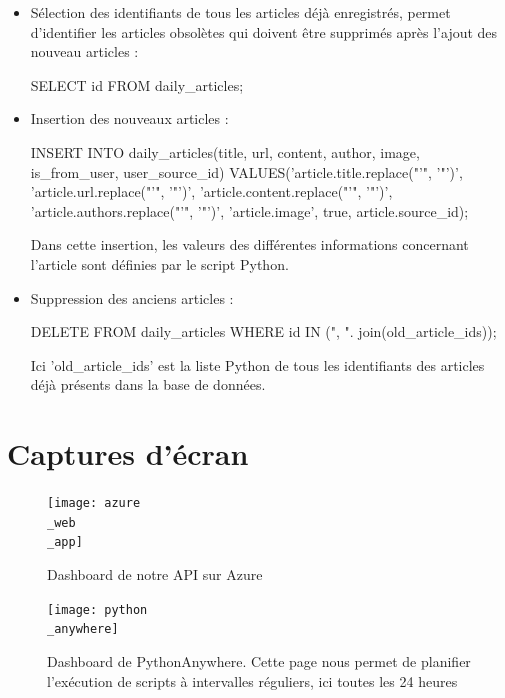 \documentclass[french]{article}
\begin{document}
\begin{itemize}
\begin{itemize}
            \item Sélection des identifiants de tous les articles déjà enregistrés, permet d'identifier les articles obsolètes qui doivent être supprimés après l'ajout des nouveau articles :
            \begin{spverbatim}
            SELECT id FROM daily_articles;
            \end{spverbatim}
            \item Insertion des nouveaux articles :
            \begin{spverbatim}
            INSERT INTO daily_articles(title, url, content, author, image, is_from_user, user_source_id) VALUES('{article.title.replace("'", '"')}', '{article.url.replace("'", '"')}', '{article.content.replace("'", '"')}', '{article.authors.replace("'", '"')}', '{article.image}', true, {article.source_id});
            \end{spverbatim}
            Dans cette insertion, les valeurs des différentes informations concernant l'article sont définies par le script Python.
            \item Suppression des anciens articles :
            \begin{spverbatim}
            DELETE FROM daily_articles WHERE id IN ({", ". join(old_article_ids)});
            \end{spverbatim}
            Ici 'old\_article\_ids' est la liste Python de tous les identifiants des articles déjà présents dans la base de données.
        \end{itemize}
    \end{itemize}



    \section*{Captures d'écran}
    \begin{figure}[h]
        \texttt{[image: azure\\\_web\\\_app]}
        \centering
        \caption{Dashboard de notre API sur Azure}
        \centering
    \end{figure}
    \begin{figure}[h]
        \texttt{[image: python\\\_anywhere]}
        \centering
        \caption{Dashboard de PythonAnywhere. Cette page nous permet de planifier l'exécution de scripts à intervalles réguliers, ici toutes les 24 heures}
        \centering
    \end{figure}
\end{document}
